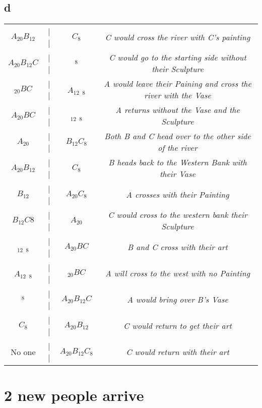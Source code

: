 \documentclass[12pt]{amsart}
\begin{document}
\subsection*{d}
\begin{tabular}{ c c c c }

$A_{20} B_{12}$ & | | & $C_{8}$ & \emph{C would cross the river with C's painting} \\

$A_{20} B_{12} C$ & | | & $_{8}$ & \emph{C would go to the starting side without their Sculpture} \\

$_{20} B C$ & | | & $A_{12}$ $_{8}$ & \emph{A would leave their Paining and cross the river with the Vase} \\

$A_{20} B C$ & | | & $_{12}$ $_{8}$ & \emph{A returns without the Vase and the Sculpture} \\

$A_{20}$ & | | & $B_{12} C_{8}$ & \emph{Both B and C head over to the other side of the river} \\

$A_{20} B_{12}$ & | | & $C_{8}$ & \emph{B heads back to the Western Bank with their Vase} \\

$B_{12}$ & | | & $A_{20} C_{8}$ & \emph{A crosses with their Painting} \\

$B_{12} C{8}$ & | | & $A_{20}$ & \emph{C would cross to the western bank their Sculpture} \\

$_{12}$ $_{8}$ & | | & $A_{20} B C$ & \emph{B and C cross with their art} \\

$A _{12}$ $_{8}$ & | | & $_{20} B C$ & \emph{A will cross to the west with no Painting} \\

$_{8}$ & | | & $A_{20} B_{12} C$ & \emph{A would bring over B's Vase} \\

$C_{8}$ & | | & $A_{20} B_{12}$ & \emph{C would return to get their art} \\

No one & | | & $A_{20} B_{12} C_{8}$ & \emph{C would return with their art}

\end{tabular}

\section*{2 new people arrive}
\end{document}

